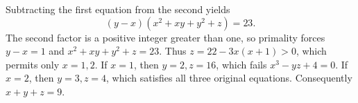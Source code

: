Subtracting the first equation from the second yields
\[(y-x)(x^2+xy+y^2+z)=23.\]
The second factor is a positive integer greater than one, so primality forces $y-x=1$ and $x^2+xy+y^2+z=23$. Thus $z=22-3x(x+1)>0$, which permits only $x=1,2$. If $x=1$, then $y=2,z=16$, which fails $x^3-yz+4=0$. If $x=2$, then $y=3,z=4$, which satisfies all three original equations. Consequently $x+y+z=\boxed9$.
